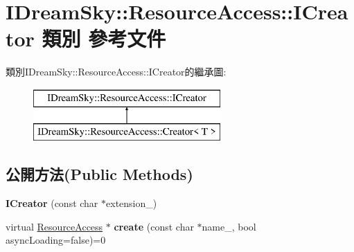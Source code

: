 \hypertarget{class_i_dream_sky_1_1_resource_access_1_1_i_creator}{}\section{I\+Dream\+Sky\+:\+:Resource\+Access\+:\+:I\+Creator 類別 參考文件}
\label{class_i_dream_sky_1_1_resource_access_1_1_i_creator}
類別\+I\+Dream\+Sky\+:\+:Resource\+Access\+:\+:I\+Creator的繼承圖\+:\begin{figure}[H]
\begin{center}
\leavevmode
\includegraphics[height=2.000000cm]{class_i_dream_sky_1_1_resource_access_1_1_i_creator}
\end{center}
\end{figure}
\subsection*{公開方法(Public Methods)}
\begin{DoxyCompactItemize}
\item 
{\bfseries I\+Creator} (const char $\ast$extension\+\_\+)\hypertarget{class_i_dream_sky_1_1_resource_access_1_1_i_creator_a86b8e0149a78a786a3d72f5f0ebf4f81}{}\label{class_i_dream_sky_1_1_resource_access_1_1_i_creator_a86b8e0149a78a786a3d72f5f0ebf4f81}

\item 
virtual \hyperlink{class_i_dream_sky_1_1_resource_access}{Resource\+Access} $\ast$ {\bfseries create} (const char $\ast$name\+\_\+, bool async\+Loading=false)=0\hypertarget{class_i_dream_sky_1_1_resource_access_1_1_i_creator_adfb7db7b32193a1d13e3cf55085c8892}{}\label{class_i_dream_sky_1_1_resource_access_1_1_i_creator_adfb7db7b32193a1d13e3cf55085c8892}

\end{DoxyCompactItemize}
